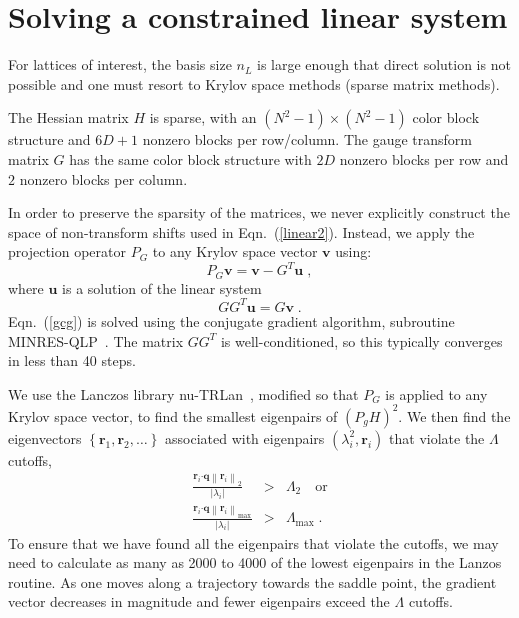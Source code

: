 \documentclass[preprint,aps,prd]{revtex4-2}
\newcommand{\be}{\begin{equation}}
\newcommand{\eq}{\end{equation}}
\begin{document}
\section{Solving a constrained linear system}
\label{krylov}

For lattices of interest, the basis size $n_L$ is large enough
that direct solution is not possible and one must resort to Krylov
space methods (sparse matrix methods).

The Hessian matrix $H$ is sparse, with an $(N^2-1)\times(N^2-1)$
color block structure and $6D+1$ nonzero blocks per row/column.
The gauge transform matrix $G$ has the same color block structure
with $2 D$ nonzero blocks per row and $2$ nonzero blocks per column.

In order to preserve the sparsity of the matrices, we never
explicitly construct the space of non-transform shifts used in
Eqn.~(\ref{linear2}).  Instead, we apply the projection
operator $P_G$ to any Krylov space vector $\mathbf{v}$ using:
\be
    P_G \mathbf{v} = \mathbf{v} - G^T \mathbf{u} \; ,
\eq
where $\mathbf{u}$ is a solution of the linear system
\be
  G G^T \mathbf{u} = G \mathbf{v} \; .\label{gcg}
\eq
Eqn.~(\ref{gcg}) is solved using the conjugate gradient
algorithm, subroutine MINRES-QLP~\cite{choi_algorithm_2014}.
The matrix $G G^T$ is well-conditioned, so this typically converges
in less than 40 steps.

We use the Lanczos library nu-TRLan~\cite{yamazaki_adaptive_2010},
modified so that $P_G$ is applied to any Krylov space vector, to
find the smallest eigenpairs of $\left(P_g H\right)^2$.  We then find
the eigenvectors $\left\{\mathbf{r}_1, \mathbf{r}_2, \ldots\right\}$
associated with eigenpairs $\left(\lambda_i^2, \mathbf{r}_i\right)$
that violate the $\Lambda$ cutoffs,
\begin{eqnarray}
   \frac{ \mathbf{r}_i \mathbf{\cdot} \mathbf{q}
   \left\lVert \mathbf{r}_i\right\rVert_2}{\left|\lambda_i\right| }
     &>& \Lambda_2  \quad\mbox{or} \\
   \frac{ \mathbf{r}_i\mathbf{\cdot} \mathbf{q}
   \left\lVert \mathbf{r}_i\right\rVert_\mathrm{max}}{\left|\lambda_i\right| }
     &>& \Lambda_\mathrm{max} \; .
\end{eqnarray}
To ensure that we have found all the eigenpairs that violate the cutoffs,
we may need to calculate as many as 2000 to 4000 of the lowest eigenpairs
in the Lanzos routine.  As one moves along a trajectory towards the
saddle point, the gradient vector decreases in magnitude and fewer eigenpairs
exceed the $\Lambda$ cutoffs.
\end{document}
